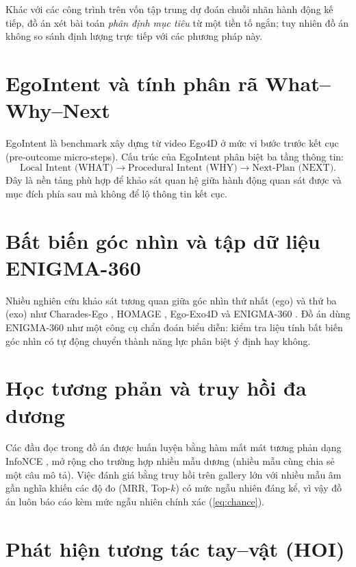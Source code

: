 \documentclass[12pt,a4paper]{report}
\begin{document}
Khác với các công trình trên vốn tập trung dự đoán chuỗi nhãn hành động kế tiếp, đồ án xét bài toán \emph{phân định mục tiêu} từ một tiền tố ngắn; tuy nhiên đồ án không so sánh định lượng trực tiếp với các phương pháp này.

\section{EgoIntent và tính phân rã What--Why--Next}

EgoIntent \citep{egointent2026} là benchmark xây dựng từ video Ego4D ở mức vi bước trước kết cục (pre-outcome micro-steps). Cấu trúc của EgoIntent phân biệt ba tầng thông tin:
\begin{equation}
    \text{Local Intent (WHAT)} \longrightarrow \text{Procedural Intent (WHY)} \longrightarrow \text{Next-Plan (NEXT)}.
\end{equation}
Đây là nền tảng phù hợp để khảo sát quan hệ giữa hành động quan sát được và mục đích phía sau mà không để lộ thông tin kết cục.

\section{Bất biến góc nhìn và tập dữ liệu ENIGMA-360}

Nhiều nghiên cứu khảo sát tương quan giữa góc nhìn thứ nhất (ego) và thứ ba (exo) như Charades-Ego \citep{sigurdsson2018charadesego}, HOMAGE \citep{rai2021homage}, Ego-Exo4D \citep{grauman2024egoexo4d} và ENIGMA-360 \citep{ragusa2026enigma360}. Đồ án dùng ENIGMA-360 như một công cụ chẩn đoán biểu diễn: kiểm tra liệu tính bất biến góc nhìn có tự động chuyển thành năng lực phân biệt ý định hay không.

\section{Học tương phản và truy hồi đa dương}

Các đầu đọc trong đồ án được huấn luyện bằng hàm mất mát tương phản dạng InfoNCE \citep{oord2018infonce}, mở rộng cho trường hợp nhiều mẫu dương (nhiều mẫu cùng chia sẻ một câu mô tả). Việc đánh giá bằng truy hồi trên gallery lớn với nhiều mẫu âm gần nghĩa khiến các độ đo (MRR, Top-$k$) có mức ngẫu nhiên đáng kể, vì vậy đồ án luôn báo cáo kèm mức ngẫu nhiên chính xác (\cref{eq:chance}).

\section{Phát hiện tương tác tay--vật (HOI)}
\label{sec:hoi_related}
\end{document}
